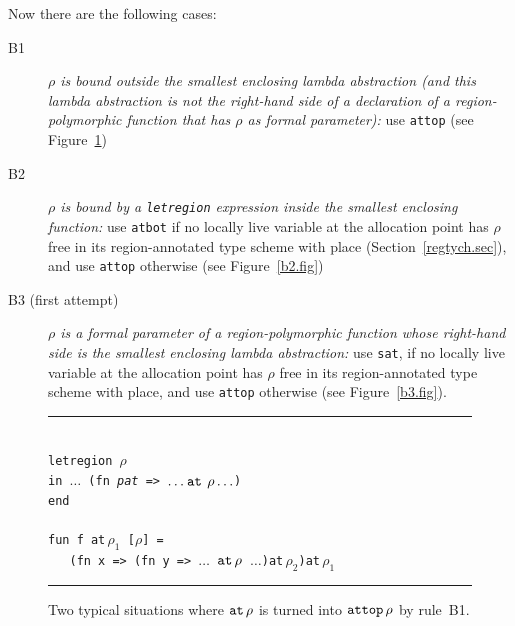 \documentclass[12pt]{book}
\begin{document}
Now there are the following cases:
\begin{description}
\item[B1] {\it $\rho$ is bound outside the smallest enclosing lambda
    abstraction (and this lambda abstraction is not the right-hand
    side of a declaration of a region-polymorphic function that has
    $\rho$ as formal parameter):} use {\tt attop}
    (see Figure~\ref{b1.fig})
  \item[B2] {\it $\rho$ is bound by a {\tt letregion} expression
      inside the smallest enclosing function:} use {\tt atbot} if no
    locally live variable at the allocation point has $\rho$ free in
    its region-annotated type scheme with place
    (Section~\ref{regtych.sec}), and use {\tt attop} otherwise 
    (see Figure~\ref{b2.fig})
  \item[B3 (first attempt)]{\it $\rho$ is a formal parameter of a
      region-polymorphic function whose right-hand side is the
      smallest enclosing lambda abstraction:} use
    {\tt sat}, if no locally live variable at the allocation point has
    $\rho$ free in its region-annotated type scheme with place, and
    use {\tt attop} otherwise (see Figure~\ref{b3.fig}).
\end{description}
\begin{figure}
\hrule
\begin{center}
\begin{tabbing}
\\
\hskip3cm\=\tt letregion $\rho$\\
       \>\tt in $\ldots$ (fn {\it pat} => $\ldots\mathbin{\hbox{\tt at}}\,\rho\ldots$)\\
       \>\tt end\\
\\
       \>\tt fun f at$\,\rho_1$ [$\rho$] =\\
       \>\tt\ \ \ (fn x => (fn y => $\ldots$ $\mathbin{\hbox{\tt at}}\,\rho$ $\ldots$)at$\,\rho_2$)at$\,\rho_1$\\
\end{tabbing}
\end{center}
\caption{Two typical situations where $\mathbin{\hbox{\tt at}}\,\rho$ is turned into $\hbox{\tt attop}\,\rho$
  by
  rule~B1.} \medskip \hrule
\label{b1.fig}
\end{figure}
\end{document}
